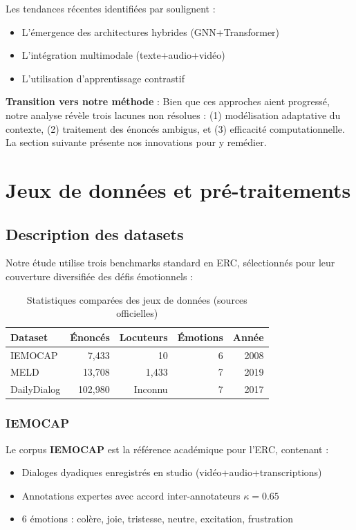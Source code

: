 \documentclass[a4paper,11pt]{article}
\begin{document}
Les tendances récentes identifiées par \cite{chen2023emotion} soulignent :

\begin{itemize}
    \item L'émergence des architectures hybrides (GNN+Transformer)
    \item L'intégration multimodale (texte+audio+vidéo)
    \item L'utilisation d'apprentissage contrastif
\end{itemize}

\textbf{Transition vers notre méthode} : Bien que ces approches aient progressé, notre analyse révèle trois lacunes non résolues : (1) modélisation adaptative du contexte, (2) traitement des énoncés ambigus, et (3) efficacité computationnelle. La section suivante présente nos innovations pour y remédier.









\section{Jeux de données et pré-traitements}
\subsection{Description des datasets}
Notre étude utilise trois benchmarks standard en ERC, sélectionnés pour leur couverture diversifiée des défis émotionnels :

\begin{table}[h]
\centering
\begin{tabular}{lrrrr}
\toprule
Dataset & Énoncés & Locuteurs & Émotions & Année \\
\midrule
IEMOCAP & 7,433 & 10 & 6 & 2008 \\
MELD & 13,708 & 1,433 & 7 & 2019 \\
DailyDialog & 102,980 & Inconnu & 7 & 2017 \\
\bottomrule
\end{tabular}
\caption{Statistiques comparées des jeux de données (sources officielles)}
\label{tab:datasets_stats}
\end{table}

\subsubsection{IEMOCAP}
Le corpus \textbf{IEMOCAP} \cite{busso2008iemocap} est la référence académique pour l'ERC, contenant :
\begin{itemize}
    \item Dialoges dyadiques enregistrés en studio (vidéo+audio+transcriptions)
    \item Annotations expertes avec accord inter-annotateurs $\kappa=0.65$
    \item 6 émotions : colère, joie, tristesse, neutre, excitation, frustration
\end{itemize}
\end{document}

